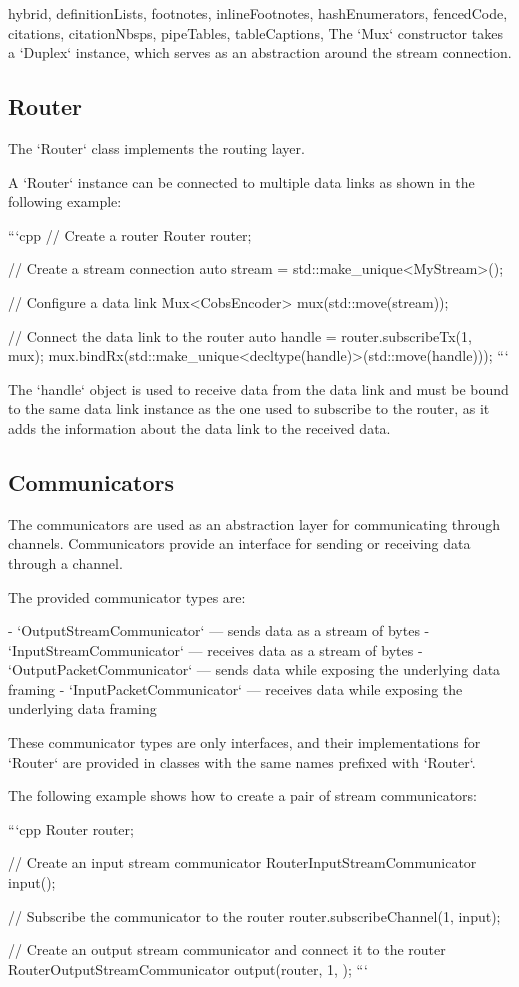 \begin{markdown*}{%
  hybrid,
  definitionLists,
  footnotes,
  inlineFootnotes,
  hashEnumerators,
  fencedCode,
  citations,
  citationNbsps,
  pipeTables,
  tableCaptions,
}
The `Mux` constructor takes a `Duplex` instance, which serves as an abstraction around the stream connection.

\subsection{Router}

The `Router` class implements the routing layer.

A `Router` instance can be connected to multiple data links as shown in the following example:

```cpp
// Create a router
Router router;

// Create a stream connection
auto stream = std::make_unique<MyStream>();

// Configure a data link
Mux<CobsEncoder> mux(std::move(stream));

// Connect the data link to the router
auto handle = router.subscribeTx(1, mux);
mux.bindRx(std::make_unique<decltype(handle)>(std::move(handle)));
```

The `handle` object is used to receive data from the data link and must be bound to the same data link instance as the one used to subscribe to the router, as it adds the information about the data link to the received data.

\subsection{Communicators}

The communicators are used as an abstraction layer for communicating through channels. Communicators provide an interface for sending or receiving data through a channel.

The provided communicator types are:

- `OutputStreamCommunicator` --- sends data as a stream of bytes
- `InputStreamCommunicator` --- receives data as a stream of bytes
- `OutputPacketCommunicator` --- sends data while exposing the underlying data framing
- `InputPacketCommunicator` --- receives data while exposing the underlying data framing

These communicator types are only interfaces, and their implementations for `Router` are provided in classes with the same names prefixed with `Router`.

The following example shows how to create a pair of stream communicators:

```cpp
Router router;

// Create an input stream communicator
RouterInputStreamCommunicator input({});

// Subscribe the communicator to the router
router.subscribeChannel(1, input);

// Create an output stream communicator and connect it to the router
RouterOutputStreamCommunicator output(router, 1, {});
```


\end{markdown*}
